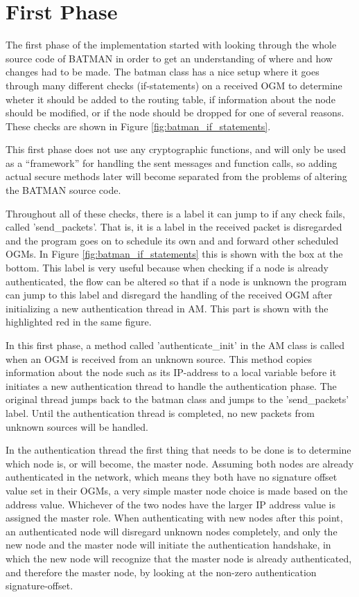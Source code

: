 \section{First Phase}
The first phase of the implementation started with looking through the whole
source code of BATMAN in order to get an understanding of where and how changes
had to be made. The batman class has a nice setup where it goes through many
different checks (if-statements) on a received \ac{OGM} to determine wheter it
should be added to the routing table, if information about the node should be
modified, or if the node should be dropped for one of several reasons. These
checks are shown in Figure \ref{fig:batman_if_statements}.

This first phase does not use any cryptographic functions, and will only be used
as a ``framework'' for handling the sent messages and function calls, so adding
actual secure methods later will become separated from the problems of altering
the BATMAN source code.

Throughout all of these checks, there is a label it can jump to if any check
fails, called 'send\_packets'. That is, it is a label in the received packet is
disregarded and the program goes on to schedule its own and and forward other
scheduled \acp{OGM}. In Figure \ref{fig:batman_if_statements} this is shown
with the box at the bottom. This label is very useful because when checking if a
node is already authenticated, the flow can be altered so that if a node is
unknown the program can jump to this label and disregard the handling of the
received \ac{OGM} after initializing a new authentication thread in \ac{AM}.
This part is shown with the highlighted red in the same figure.

In this first phase, a method called 'authenticate\_init' in the \ac{AM} class
is called when an \ac{OGM} is received from an unknown source. This method
copies information about the node such as its IP-address to a local variable
before it initiates a new authentication thread to handle the authentication
phase. The original thread jumps back to the batman class and jumps to the
'send\_packets' label. Until the authentication thread is completed, no new
packets from unknown sources will be handled.

In the authentication thread the first thing that needs to be done is to
determine which node is, or will become, the master node. Assuming both nodes
are already authenticated in the network, which means they both have no
signature offset value set in their \acp{OGM}, a very simple master node choice
is made based on the address value. Whichever of the two nodes have the larger
IP address value is assigned the master role. When authenticating with new nodes
after this point, an authenticated node will disregard unknown nodes
completely, and only the new node and the master node will initiate
the authentication handshake, in which the new node will recognize that the
master node is already authenticated, and therefore the master node, by looking
at the non-zero authentication signature-offset.

